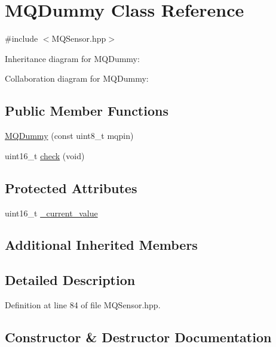 \hypertarget{class_m_q_dummy}{}\section{M\+Q\+Dummy Class Reference}
\label{class_m_q_dummy}


{\ttfamily \#include $<$M\+Q\+Sensor.\+hpp$>$}



Inheritance diagram for M\+Q\+Dummy\+:


Collaboration diagram for M\+Q\+Dummy\+:
\subsection*{Public Member Functions}
\begin{DoxyCompactItemize}
\item 
\hyperlink{class_m_q_dummy_acd45bbb9678e3578b0600ecaa74f0120}{M\+Q\+Dummy} (const uint8\+\_\+t mqpin)
\item 
uint16\+\_\+t \hyperlink{class_m_q_dummy_a36c209a1aae7acd690da607677a90181}{check} (void)
\end{DoxyCompactItemize}
\subsection*{Protected Attributes}
\begin{DoxyCompactItemize}
\item 
uint16\+\_\+t \hyperlink{class_m_q_dummy_af00eaac2153761e9bbdf201d95bf415a}{\+\_\+current\+\_\+value}
\end{DoxyCompactItemize}
\subsection*{Additional Inherited Members}


\subsection{Detailed Description}


Definition at line 84 of file M\+Q\+Sensor.\+hpp.



\subsection{Constructor \& Destructor Documentation}
